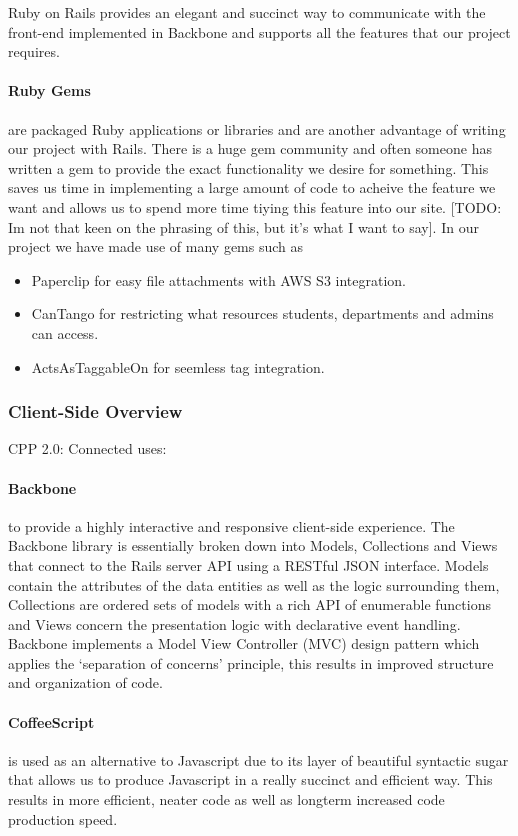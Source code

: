 		Ruby on Rails provides an elegant and succinct way to communicate with the front-end implemented in Backbone and supports all the features that our project requires. 

		\paragraph{Ruby Gems\cite{gems}} are packaged Ruby applications or libraries and are another advantage of writing our project with Rails. There is a huge gem community and often someone has written a gem to provide the exact functionality we desire for something. This saves us time in implementing a large amount of code to acheive the feature we want and allows us to spend more time tiying this feature into our site. [TODO: Im not that keen on the phrasing of this, but it's what I want to say]. In our project we have made use of many gems such as
		\begin{itemize}
		 \item Paperclip\cite{paperclip} for easy file attachments with AWS S3\cite{s3} integration.
		 \item CanTango\cite{cantango} for restricting what resources students, departments and admins can access.
		 \item ActsAsTaggableOn\cite{tags} for seemless tag integration.
		\end{itemize}
	\subsubsection{Client-Side Overview}
		CPP 2.0: Connected uses:
		\paragraph{Backbone\cite{backbone}} to provide a highly interactive and responsive client-side experience. The Backbone library is essentially broken down into Models, Collections and Views that connect to the Rails server API using a RESTful JSON interface. Models contain the attributes of the data entities as well as the logic surrounding them, Collections are ordered sets of models with a rich API of enumerable functions and Views concern the presentation logic with declarative event handling. Backbone implements a Model View Controller (MVC) design pattern which applies the ‘separation of  concerns’ principle, this results in improved structure and organization of code.
		\paragraph{CoffeeScript\cite{coffeescript}} is used as an alternative to Javascript due to its layer of beautiful syntactic sugar that allows us to produce Javascript in a really succinct and efficient way. This results in more efficient, neater code as well as longterm increased code production speed.
